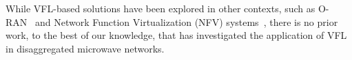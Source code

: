While VFL-based solutions have been explored in other contexts, such as O-RAN~\cite{FTL_Ref2} and Network Function Virtualization (NFV) systems~\cite{10329604}, there is no prior work, to the best of our knowledge, that has investigated the application of VFL in disaggregated microwave networks. 


